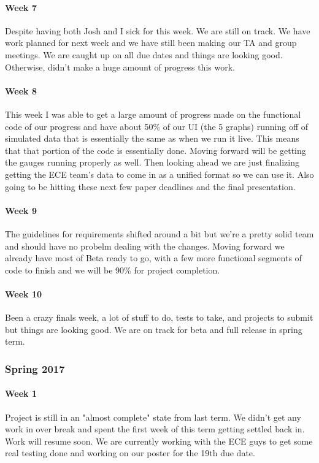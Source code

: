 \documentclass[10pt,draftclsnofoot,onecolumn,retainorgcmds]{IEEEtran}
\begin{document}
\paragraph{Week 7}
Despite having both Josh and I sick for this week. We are still on track. We have work planned for next week and we have still been making our TA and group meetings. We are caught up on all due dates and things are looking good. Otherwise, didn't make a huge amount of progress this work.\\
\paragraph{Week 8}
This week I was able to get a large amount of progress made on the functional code of our progress and have about 50\% of our UI (the 5 graphs) running off of simulated data that is essentially the same as when we run it live. This means that that portion of the code is essentially done. Moving forward will be getting the gauges running properly as well. Then looking ahead we are just finalizing getting the ECE team's data to come in as a unified format so we can use it. Also going to be hitting these next few paper deadlines and the final presentation.\\
\paragraph{Week 9}
The guidelines for requirements shifted around a bit but we're a pretty solid team and should have no probelm dealing with the changes. Moving forward we already have most of Beta ready to go, with a few more functional segments of code to finish and we will be 90\% for project completion.\\
\paragraph{Week 10}
Been a crazy finals week, a lot of stuff to do, tests to take, and projects to submit but things are looking good. We are on track for beta and full release in spring term. \\
\subsubsection{Spring 2017}
\paragraph{Week 1}
Project is still in an "almost complete" state from last term. We didn't get any work in over break and spent the first week of this term getting settled back in. Work will resume soon. We are currently working with the ECE guys to get some real testing done and working on our poster for the 19th due date. \\
\end{document}

